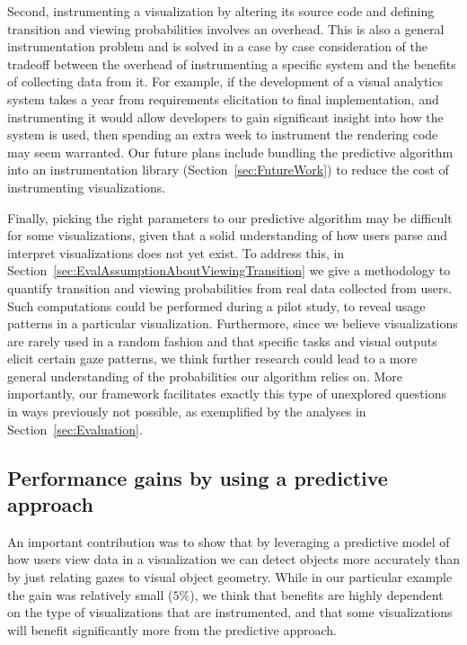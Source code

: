 Second, instrumenting a visualization by altering its source code and defining transition and viewing probabilities involves an overhead. This is also a general instrumentation problem and is solved in a case by case consideration of the tradeoff between the overhead of instrumenting a specific system and the benefits of collecting data from it. For example, if the development of a visual analytics system takes a year from requirements elicitation to final implementation, and instrumenting it would allow developers to gain significant insight into how the system is used, then spending an extra week to instrument the rendering code may seem warranted.  Our future plans include bundling the predictive algorithm into an instrumentation library (Section~\ref{sec:FutureWork})  to reduce the cost of instrumenting visualizations.  



Finally, picking the right parameters to our predictive algorithm may be difficult for some visualizations, given that a solid understanding of how users parse and interpret visualizations does not yet exist. To address this, in Section~\ref{sec:EvalAssumptionAboutViewingTransition}  we give a methodology to quantify transition and viewing probabilities from real data collected from users. Such computations could be performed during a pilot study, to reveal usage patterns in a particular visualization. Furthermore, since we believe visualizations are rarely used in a random fashion and that specific tasks and visual outputs elicit certain gaze patterns, we think further research could lead to a more general understanding of the probabilities our algorithm relies on.  More importantly, our framework facilitates exactly this type of unexplored questions in ways previously not possible, as exemplified by the analyses in Section~\ref{sec:Evaluation}. 
 

\subsection{Performance gains by using a predictive approach}
An important contribution was to show that by leveraging a predictive model of how users view data in a visualization we can detect objects more accurately than by just relating gazes to visual object geometry. While in our particular example the gain was relatively small ($5\%$), we think that benefits are highly dependent on the type of visualizations that are instrumented, and that some visualizations will benefit significantly more from the predictive approach. 

